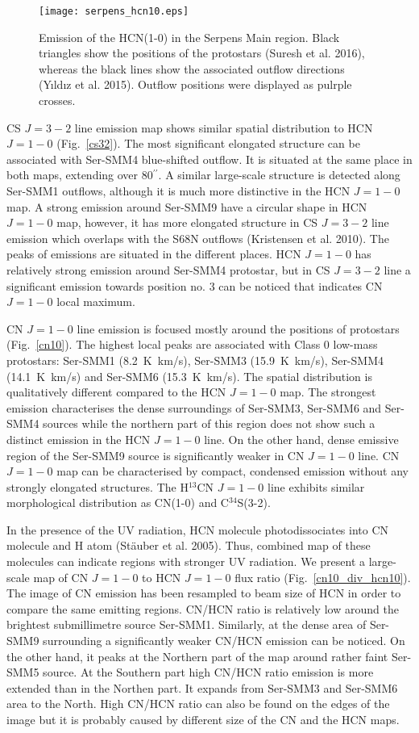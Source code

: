 \documentclass{aa}
\begin{document}
\begin{figure}
   \centering
   \texttt{[image: serpens\_hcn10.eps]}
      \caption{Emission of the HCN(1-0) in the Serpens Main region. Black triangles show the positions of the protostars (Suresh et al. 2016), whereas the black lines show the associated outflow directions (Y{\i}ld{\i}z et al. 2015). Outflow positions were displayed as pulrple crosses.}
         \label{hcn10}
   \end{figure}

CS $J=3-2$ line emission map shows similar spatial distribution to HCN $J=1-0$ (Fig.~\ref{cs32}). The most significant elongated structure can be associated with Ser-SMM4 blue-shifted outflow. It is situated at the same place in both maps, extending over 80$^{\prime\prime}$. A similar large-scale structure is detected along Ser-SMM1 outflows, although it is much more distinctive in the HCN $J=1-0$ map. A strong emission around Ser-SMM9 have a circular shape in HCN $J=1-0$ map, however, it has more elongated structure in CS $J=3-2$ line emission which overlaps with the S68N outflows (Kristensen et al. 2010). The peaks of emissions are situated in the different places. HCN $J=1-0$ has relatively strong emission around Ser-SMM4 protostar, but in CS $J=3-2$ line a significant emission towards position no. 3 can be noticed that indicates CN $J=1-0$ local maximum. 

CN $J=1-0$ line emission is focused mostly around the positions of protostars (Fig.~\ref{cn10}). 
The highest local peaks are associated with Class 0 low-mass protostars: Ser-SMM1 (8.2~K~km/s), Ser-SMM3 (15.9~K~km/s), Ser-SMM4 (14.1~K~km/s) and Ser-SMM6 (15.3~K~km/s). The spatial distribution is qualitatively different compared to the HCN $J=1-0$ map. The strongest emission characterises the dense surroundings of Ser-SMM3, Ser-SMM6 and Ser-SMM4 sources while the northern part of this region does not show such a distinct emission in the HCN $J=1-0$ line. On the other hand, dense emissive region of the Ser-SMM9 source is significantly weaker in CN $J=1-0$ line. CN $J=1-0$ map can be characterised by compact, condensed emission without any strongly elongated structures. The H$^{13}$CN $J=1-0$ line exhibits similar morphological distribution as CN(1-0) and \mbox{C$^{34}$S(3-2)}. 

In the presence of the UV radiation, HCN molecule photodissociates into CN molecule and H atom (Stäuber et al. 2005). Thus, combined map of these molecules can indicate regions with stronger UV radiation. We present a large-scale map of CN $J=1-0$ to HCN $J=1-0$ flux ratio (Fig.~\ref{cn10_div_hcn10}). The image of CN emission has been resampled to beam size of HCN in order to compare the same emitting regions. CN/HCN ratio is relatively low around the brightest submillimetre source Ser-SMM1. Similarly, at the dense area of Ser-SMM9 surrounding a significantly weaker CN/HCN emission can be noticed. On the other hand, it peaks at the Northern part of the map around rather faint Ser-SMM5 source. At the Southern part high CN/HCN ratio emission is more extended than in the Northen part. It expands from Ser-SMM3 and Ser-SMM6 area to the North. High CN/HCN ratio can also be found on the edges of the image but it is probably caused by different size of the CN and the HCN maps.
\end{document}

